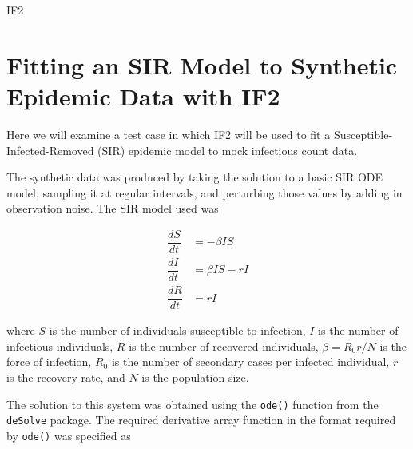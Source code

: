 \documentclass[12pt]{article}
\begin{document}
\begin{algorithm}[H]
{{	        }

	        \BlankLine


	    }

        \BlankLine


        \BlankLine

        \caption{IF2}\label{if2}

    \end{algorithm}



\section{Fitting an SIR Model to Synthetic Epidemic Data with IF2}

    Here we will examine a test case in which IF2 will be used to fit a Susceptible-Infected-Removed (SIR) epidemic model to mock infectious count data.

    The synthetic data was produced by taking the solution to a basic SIR ODE model, sampling it at regular intervals, and perturbing those values by adding in observation noise. The SIR model used was

    \begin{equation}
        \begin{array}{rl}
            \dfrac{dS}{dt} & = - \beta I S \\
            \dfrac{dI}{dt} & = \beta I S - rI  \\
            \dfrac{dR}{dt} & = rI
        \end{array}
    \end{equation}

    where $S$ is the number of individuals susceptible to infection, $I$ is the number of infectious individuals, $R$ is the number of recovered individuals, $\beta = R_0 r / N$ is the force of infection, $R_0$ is the number of secondary cases per infected individual, $r$ is the recovery rate, and $N$ is the population size.

    The solution to this system was obtained using the \verb|ode()| function from the \verb|deSolve| package. The required derivative array function in the format required by \verb|ode()| was specified as
\end{document}
